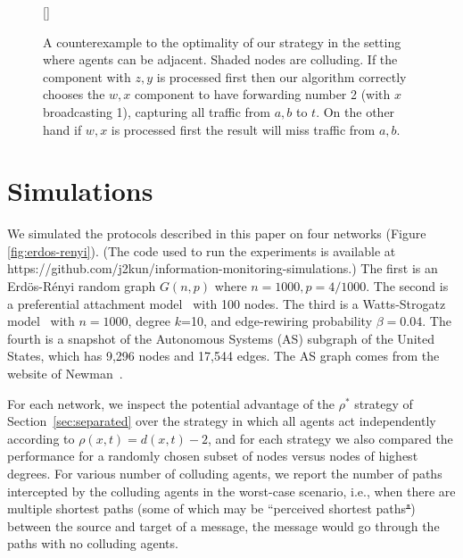 \documentclass{comnet}
\providecommand{\DIFadd}[1]{{\protect\color{blue}\uwave{#1}}} %
\providecommand{\DIFdel}[1]{{\protect\color{red}\sout{#1}}}                      %
\providecommand{\DIFaddbegin}{} %
\providecommand{\DIFaddend}{} %
\providecommand{\DIFdelbegin}{} %
\providecommand{\DIFdelend}{} %
\begin{document}
\begin{figure}[h]
[\FBwidth]
{\caption{A counterexample to the optimality of our strategy in the setting
where agents can be adjacent. Shaded nodes are colluding. If the component with
$z,y$ is processed first then our algorithm correctly chooses the $w,x$
component to have forwarding number 2 (with $x$ broadcasting 1), capturing all
traffic from $a,b$ to $t$.  On the other hand if $w,x$ is processed first the
result will miss traffic from $a,b$.} \label{fig:forwarding-ctex}}
{} \end{figure}


\section{Simulations} \label{sec:simulations}

We simulated the protocols described in this paper on four networks (Figure
\ref{fig:erdos-renyi}). (The code used to run the experiments is available at
https://github.com/j2kun/information-monitoring-simulations.) The first is an
Erd\"os-R\'enyi random graph $G(n, p)$ where $n = 1000, p = 4/1000$. The second
is a preferential attachment model~\cite{BarabasiA99} with 100 nodes. The third
is a Watts-Strogatz model~\cite{WattsS98} with $n=1000$, degree $k$=10, and
edge-rewiring probability $\beta=0.04$. The fourth is a snapshot of the
Autonomous Systems (AS) subgraph of the United States, which has 9,296 nodes
and 17,544 edges. The AS graph comes from the website of
Newman~\cite{Newman06}. 
\DIFaddbegin 

\DIFaddend For each network, we inspect the potential advantage of the $\rho^*$ strategy
of Section~\ref{sec:separated} over the strategy in which all agents act
independently according to $\rho(x,t) = d(x,t) - 2$, and for each strategy we
also compared the performance for a randomly chosen subset of nodes versus
nodes of highest degrees. For various number of colluding agents, we report the
number of paths intercepted by the colluding agents in the worst-case scenario,
i.e., when there are multiple  shortest paths (some of which may be ``perceived
shortest paths\DIFdelbegin \DIFdel{"}\DIFdelend \DIFaddbegin \DIFadd{''}\DIFaddend ) between the source and target of a message, the message would
go through the paths with no colluding agents.
\end{document}
